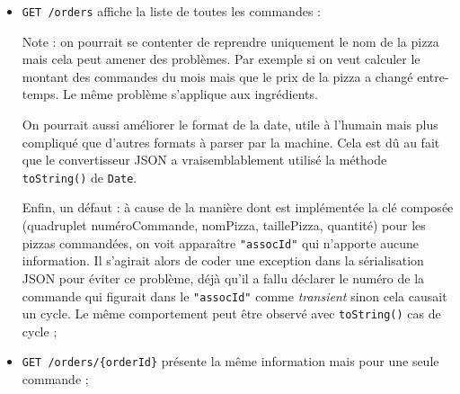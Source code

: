 \begin{itemize}
    \item \verb|GET /orders| affiche la liste de toutes les commandes :
\begin{jsoncode}
\end{jsoncode}

Note : on pourrait se contenter de reprendre uniquement le nom de la pizza mais cela peut amener
des problèmes. Par exemple si on veut calculer le montant des commandes du mois mais
que le prix de la pizza a changé entre-temps. Le même problème s'applique aux ingrédients.

On pourrait aussi améliorer le format de la date, utile à l'humain mais plus compliqué que d'autres
formats à parser par la machine. Cela est dû au fait que le convertisseur JSON a vraisemblablement utilisé
la méthode \verb|toString()| de \verb|Date|.

Enfin, un défaut : à cause de la manière dont est implémentée la clé composée 
(quadruplet numéroCommande, nomPizza, taillePizza, quantité) 
pour les pizzas commandées, on voit apparaître \verb|"assocId"| qui n'apporte aucune information.
Il s'agirait alors de coder une exception dans la sérialisation JSON pour éviter ce problème, déjà
qu'il a fallu déclarer le numéro de la commande qui figurait dans le \verb|"assocId"| comme \emph{transient}
sinon cela causait un cycle. Le même comportement peut être observé avec \verb|toString()| cas de cycle ;

    \item \verb|GET /orders/{orderId}| présente la même information mais pour une seule commande ;


\end{itemize}
